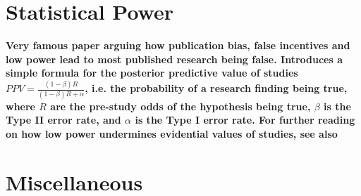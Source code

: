 \documentclass[12pt]{scrartcl}
\begin{document}
\section{Statistical Power}

\begin{description}
  \item {}
  \item {}
  \item {}
  \item {}
  \item {}
  \item {}
  \item {}
  \item {}
  
    \textbf{Very famous paper arguing how publication bias, false incentives and low power lead to most published research being false. Introduces a simple formula for the posterior predictive value of studies $PPV = \frac{(1 - \beta)R}{(1 - \beta)R + \alpha}$, i.e. the probability of a research finding being true, where $R$ are the pre-study odds of the hypothesis being true, $\beta$ is the Type II error rate, and $\alpha$ is the Type I error rate. For further reading on how low power undermines evidential values of studies, see also \cite{button2013power}}
    
  \item {}
\end{description}


\section{Miscellaneous}
\end{document}
